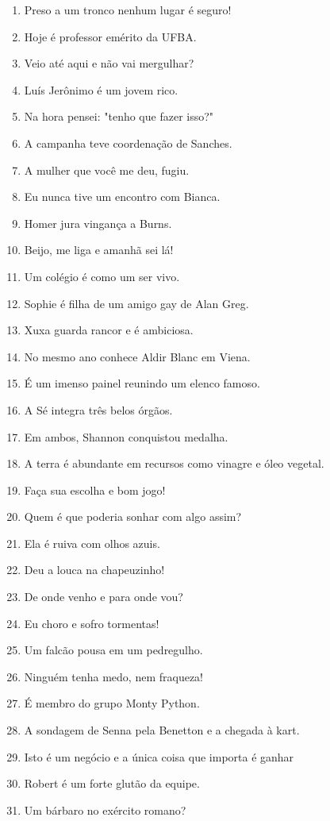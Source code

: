 \begin{enumerate}
\item Preso a um tronco nenhum lugar \'e seguro!
\item Hoje \'e professor em\'erito da UFBA.
\item Veio at\'e aqui e n\~ao vai mergulhar?
\item Lu\'is Jer\^onimo \'e um jovem rico.
\item Na hora pensei: "tenho que fazer isso?"
\item A campanha teve coordena\c{c}\~ao de Sanches.
\item A mulher que voc\^e me deu, fugiu.
\item Eu nunca tive um encontro com Bianca.
\item Homer jura vingan\c{c}a a Burns.
\item Beijo, me liga e amanh\~a sei l\'a!
\item Um col\'egio \'e como um ser vivo.
\item Sophie \'e filha de um amigo gay de Alan Greg.
\item Xuxa guarda rancor e \'e ambiciosa.
\item No mesmo ano conhece Aldir Blanc em Viena.
\item \'E um imenso painel reunindo um elenco famoso.
\item A S\'e integra tr\^es belos \'org\~aos.
\item Em ambos, Shannon conquistou medalha.
\item A terra \'e abundante em recursos como vinagre e \'oleo vegetal.
\item Fa\c{c}a sua escolha e bom jogo!
\item Quem \'e que poderia sonhar com algo assim?
\item Ela \'e ruiva com olhos azuis.
\item Deu a louca na chapeuzinho!
\item De onde venho e para onde vou?
\item Eu choro e sofro tormentas!
\item Um falc\~ao pousa em um pedregulho.
\item Ningu\'em tenha medo, nem fraqueza!
\item \'E membro do grupo Monty Python.
\item A sondagem de Senna pela Benetton e a chegada \`a kart.
\item Isto \'e um neg\'ocio e a \'unica coisa que importa \'e ganhar
\item Robert \'e um forte glut\~ao da equipe.
\item Um b\'arbaro no ex\'ercito romano?

\end{enumerate}
